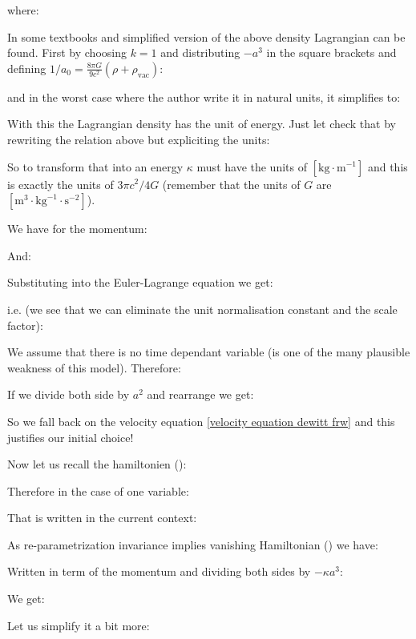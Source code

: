 	where:
	
	\begin{tcolorbox}[title=Remark,colframe=black,arc=10pt]
	In some textbooks and simplified version of the above density Lagrangian can be found. First by choosing $k=1$ and distributing $-a^3$ in the square brackets and defining $1/a_0=\frac{8\pi G}{9c^2}\left(\rho+\rho_\text{vac}\right)$:
	
	and in the worst case where the author write it in natural units, it simplifies to:
	
	\end{tcolorbox}
	With this the Lagrangian density has the unit of energy. Just let check that by rewriting the relation above but expliciting the units:
	
	So to transform that into an energy $\kappa$ must have the units of $[\text{kg}\cdot \text{m}^{-1}]$ and this is exactly the units of $3\pi c^2/4G$ (remember that the units of $G$ are $[\text{m}^3\cdot \text{kg}^{-1}\cdot \text{s}^{-2}]$).
	
	We have for the momentum:
	
	And:
	
	Substituting into the Euler-Lagrange equation we get:
	
	i.e. (we see that we can eliminate the unit normalisation constant and the scale factor):
	
	We assume that there is no time dependant variable (is one of the many plausible weakness of this model). Therefore:
	
	If we divide both side by $a^2$ and rearrange we get:
	
	So we fall back on the velocity equation \eqref{velocity equation dewitt frw} and this justifies our initial choice!
	
	Now let us recall the hamiltonien ():
	
	Therefore in the case of one variable:
	
	That is written in the current context:
	
	As re-parametrization invariance implies vanishing Hamiltonian () we have:
	
	Written in term of the momentum and dividing both sides by $-\kappa a^3$:
	
	We get:
	
	Let us simplify it a bit more:
	
